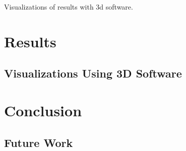 \documentclass[twocolumn]{article}
\begin{document}
	Visualizations of results with 3d software.

	\section{Results}
	
	\subsection{Visualizations Using 3D Software}

	\section{Conclusion}
	
	\subsection{Future Work}

	
		
  
\end{document}

